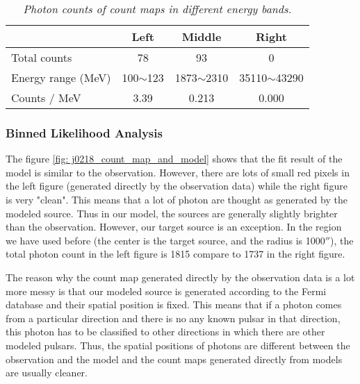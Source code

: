 \documentclass[12pt]{report}
\newcommand{\mycaption}[1]{\caption{\textit{\footnotesize #1}}}
\begin{document}
          \begin{table}[!h]   
            \centering
            \begin{tabular}{m{4cm} | c | c | c }
              & Left & Middle & Right \\
              \hline
              Total counts & 78 & 93 & 0 \\
              \hline 
              Energy range (MeV) & 100$\sim$123 & 1873$\sim$2310 & 35110$\sim$43290 \\ 
              \hline
              Counts / MeV & 3.39 & 0.213 & 0.000 \\  
            \end{tabular}
            \mycaption{Photon counts of count maps in different energy bands.}
            \label{table:j0218_ccube_photon_counts}
          \end{table}

          \subsubsection{Binned Likelihood Analysis}

            The figure \ref{fig: j0218_count_map_and_model} shows that the fit result of the model 
            is similar to the observation. However, 
            there are lots of small red pixels in the left figure (generated directly by the observation data) while the 
            right figure is very "clean". This means that a lot of photon are thought as generated by the modeled 
            source. Thus in our model, the sources are generally slightly brighter than the observation. However, our target
            source is an exception. In the region we have used before (the center is the target source, and the radius is
            1000$''$), the total photon count in the left figure is 1815 compare to 1737 in the right figure. 

            The reason why the count map generated directly by the observation data is a lot more messy is that our modeled 
            source is generated according to the Fermi database and their spatial position is fixed. This means that if 
            a photon comes from a particular direction and there is no any known pulsar in that direction, this 
            photon has to be classified to other directions in which there are other modeled pulsars.  
            Thus, the spatial positions of photons are different between the observation and the model and 
            the count maps generated directly from models are usually cleaner. 
            
\end{document}
